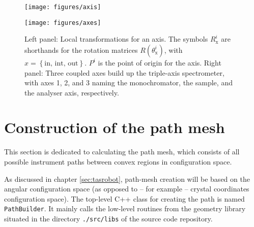 \begin{figure*}
	\begin{minipage}{0.45 \textwidth}
		\begin{center}
			\texttt{[image: figures/axis]}
		\end{center}
	\end{minipage}
	\begin{minipage}{0.45 \textwidth}
		\begin{center}
			\texttt{[image: figures/axes]}
		\end{center}
	\end{minipage}
	\caption{Left panel: Local transformations for an axis. The symbols $R_{\mathrm{x}}^i$ are shorthands
	for the rotation matrices $R\left( \theta_{\mathrm{x}}^i \right)$, with $x = \left\{ \mathrm{in,\, int,\, out} \right\}$.
	$P^i$ is the point of origin for the axis.
	Right panel: Three coupled axes build up the triple-axis spectrometer, with axes 1, 2, and 3 naming the monochromator,
	the sample, and the analyser axis, respectively.
	\label{fig:tas_axes}}
\end{figure*}






\section{Construction of the path mesh}
\label{sec:buildpath}
This section is dedicated to calculating the path mesh, which consists of all possible instrument paths between
convex regions in configuration space.

As discussed in chapter \ref{sec:tasrobot}, path-mesh creation will be based on the angular configuration space
(as opposed to -- for example -- crystal coordinates configuration space). 
The top-level C++ class for creating the path is named \lstinline[language=C++]|PathBuilder|. 
It mainly calls the low-level routines from the geometry library situated in the directory \lstinline|./src/libs| of 
the source code repository.


